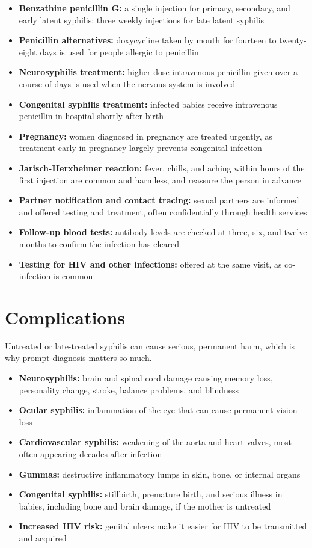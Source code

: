 \begin{itemize}
    \item \textbf{Benzathine penicillin G:} a single injection for primary, secondary, and early latent syphilis; three weekly injections for late latent syphilis
    \item \textbf{Penicillin alternatives:} doxycycline taken by mouth for fourteen to twenty-eight days is used for people allergic to penicillin
    \item \textbf{Neurosyphilis treatment:} higher-dose intravenous penicillin given over a course of days is used when the nervous system is involved
    \item \textbf{Congenital syphilis treatment:} infected babies receive intravenous penicillin in hospital shortly after birth
    \item \textbf{Pregnancy:} women diagnosed in pregnancy are treated urgently, as treatment early in pregnancy largely prevents congenital infection
    \item \textbf{Jarisch-Herxheimer reaction:} fever, chills, and aching within hours of the first injection are common and harmless, and reassure the person in advance
    \item \textbf{Partner notification and contact tracing:} sexual partners are informed and offered testing and treatment, often confidentially through health services
    \item \textbf{Follow-up blood tests:} antibody levels are checked at three, six, and twelve months to confirm the infection has cleared
    \item \textbf{Testing for HIV and other infections:} offered at the same visit, as co-infection is common
\end{itemize}

\section*{Complications}
Untreated or late-treated syphilis can cause serious, permanent harm, which is why prompt diagnosis matters so much.

\begin{itemize}
    \item \textbf{Neurosyphilis:} brain and spinal cord damage causing memory loss, personality change, stroke, balance problems, and blindness
    \item \textbf{Ocular syphilis:} inflammation of the eye that can cause permanent vision loss
    \item \textbf{Cardiovascular syphilis:} weakening of the aorta and heart valves, most often appearing decades after infection
    \item \textbf{Gummas:} destructive inflammatory lumps in skin, bone, or internal organs
    \item \textbf{Congenital syphilis:} stillbirth, premature birth, and serious illness in babies, including bone and brain damage, if the mother is untreated
    \item \textbf{Increased HIV risk:} genital ulcers make it easier for HIV to be transmitted and acquired
\end{itemize}

